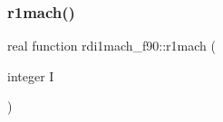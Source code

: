 \mbox{\label{namespacerdi1mach__f90_a980c645c9cef138b3dbc0b2f1ab2e04d}} 
\subsubsection{\texorpdfstring{r1mach()}{r1mach()}}
{\footnotesize\ttfamily real function rdi1mach\+\_\+f90\+::r1mach (\begin{DoxyParamCaption}\item[{integer}]{I }\end{DoxyParamCaption})}

